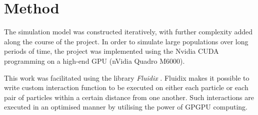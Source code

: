 \section{Method} %
The simulation model was constructed iteratively, with further complexity added along the course of the project. In order to simulate large populations over long periods of time, the project was implemented using the Nvidia CUDA programming on a high-end GPU (nVidia Quadro M6000).

This work was facilitated using the library \emph{Fluidix} \citep{fluidix}. Fluidix makes it possible to write custom interaction function to be executed on either each particle or each pair of particles within a certain distance from one another. Such interactions are executed in an optimised manner by utilising the power of GPGPU computing.